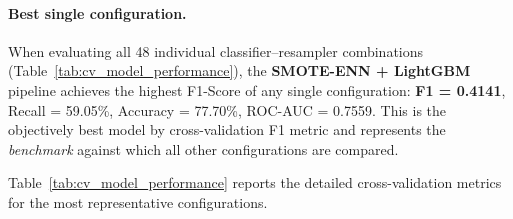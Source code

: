 \paragraph{Best single configuration.} When evaluating all 48 individual classifier--resampler combinations (Table~\ref{tab:cv_model_performance}), the \textbf{SMOTE-ENN + LightGBM} pipeline achieves the highest F1-Score of any single configuration: \textbf{F1 = 0.4141}, Recall = 59.05\%, Accuracy = 77.70\%, ROC-AUC = 0.7559. This is the objectively best model by cross-validation F1 metric and represents the \textit{benchmark} against which all other configurations are compared.

Table~\ref{tab:cv_model_performance} reports the detailed cross-validation metrics for the most representative configurations.

\begin{table}[htbp]
    \centering
    \caption{5-Fold Cross-Validation Performance (Training Set, $N_{\text{train}} = 256$). The top-performing configuration (SMOTE-ENN + LightGBM) is highlighted.}
    \label{tab:cv_model_performance}
\end{table}

